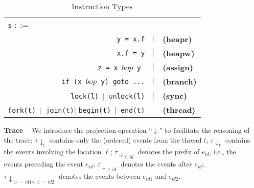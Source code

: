 
\begin{table}
	\begin{center}
		\begin{tabular}{rcl}
			\multicolumn{1}{l}{{\tt s} $::=$} & & \\
			{\tt y = x.f} & $|$ & {\bf (heapr)} \\ 
			{\tt x.f = y}  & $|$ & {\bf (heapw)} \\ %
			{\tt z = x $bop$ y}\  & $|$ & {\bf (assign)} \\ %
			{\tt if (x $bop$  y) goto ...} & $|$ &  {\bf (branch)} \\
			{\tt lock(l)}\ $|$\ {\tt unlock(l)}  & $|$& {\bf (sync)} \\
			{\tt fork(t)}\ $|$\ {\tt join(t)}$|$ {\tt begin(t)}\ $|$\ {\tt end(t)} &  & {\bf (thread)}
		\end{tabular}
	\end{center}
	\caption{\label{Ta:syntax}Instruction Types}
\end{table}


{\bf Trace \ } 
We introduce the projection operation ``$\downarrow$'' to facilitate the reasoning of the trace:
$\tau\downarrow_{t}$ contains only the (ordered) events from the thread $t$; $\tau\downarrow_{\ell}$ contains the events involving the location $\ell$; $\tau\downarrow_{\leq id}$ denotes the prefix of $e_{id}$, i.e., the events preceding the event $e_{id}$; $\tau\downarrow_{\geq id}$ denotes the events after $e_{id}$; $\tau\downarrow_{>=id1\wedge <=id2}$ denotes the events between $e_{id1}$ and $e_{id2}$.







